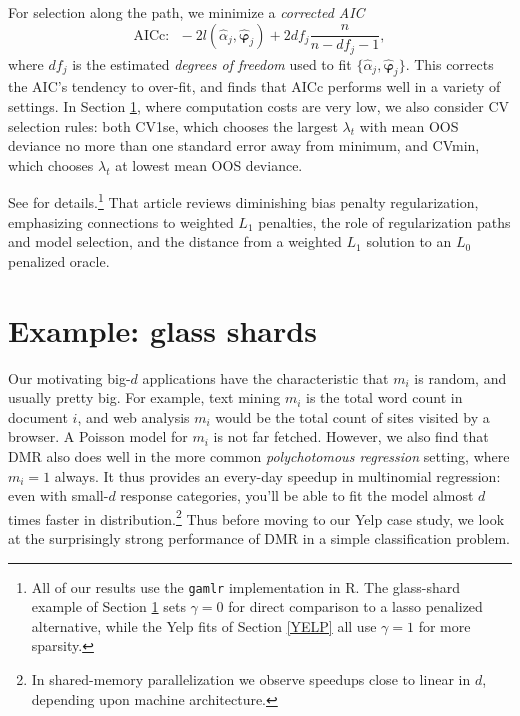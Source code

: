 \documentclass[12pt]{article}
\newcommand{\bs}[1]{\boldsymbol{#1}}
\begin{document}
For selection along the path, we
minimize a {\it corrected AIC} \citep{hurvich_regression_1989}
\begin{equation}
\text{AICc:}~~~-2l(\hat\alpha_j,\bs{\hat\varphi}_j) + 2df_j\frac{n}{n-df_j-1},
\end{equation}
where $df_j$ is the estimated {\it degrees of freedom} used to fit
$\{\hat\alpha_j,\bs{\hat\varphi}_j\}$.  This corrects the AIC's tendency to
over-fit, and \cite{taddy_gamma_2013} finds that AICc performs well in a
variety of settings.   In Section
\ref{FGL}, where computation costs are very low, we also consider CV selection
rules: both CV1se, which chooses the largest $\lambda_t$ with mean OOS
deviance no more than one standard error away from  minimum, and CVmin,
which chooses $\lambda_t$ at lowest mean OOS deviance.

See \cite{taddy_gamma_2013} for details.\footnote{All of our results use the
{\tt gamlr} implementation in R.  The glass-shard example of Section \ref{FGL}
sets $\gamma=0$ for direct comparison to a lasso penalized alternative, while
the Yelp fits of Section \ref{YELP} all use $\gamma=1$ for more sparsity.}
That article reviews diminishing bias penalty regularization, emphasizing
connections to weighted $L_1$ penalties, the role of regularization paths and
model selection, and the distance from a weighted $L_1$ solution to an $L_0$
penalized oracle.


\section{Example: glass shards}
\label{FGL}


Our motivating big-$d$ applications have the characteristic that $m_i$ is
random, and usually pretty big.  For example, text mining $m_i$ is the total
word count in document $i$, and web analysis $m_i$ would be the total count of
sites visited by a browser.  A Poisson model for $m_i$ is not far fetched.
However, we also find that DMR also does well in the more common {\it
polychotomous regression} setting, where $m_i=1$ always. It thus provides an
every-day speedup in multinomial regression: even with small-$d$ response
categories, you'll be able to fit the model almost $d$ times faster in
distribution.\footnote{In shared-memory parallelization we observe
speedups close to linear in $d$, depending upon machine
architecture.} Thus before moving to our Yelp case study, we look at the
surprisingly strong performance of DMR in a simple classification problem.
\end{document}
